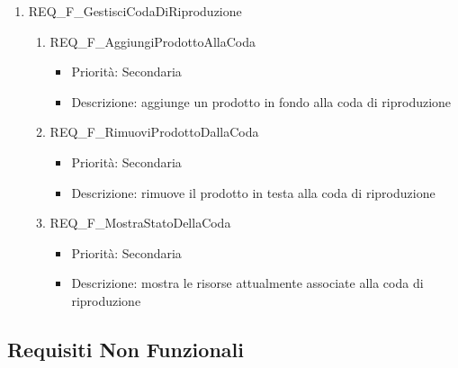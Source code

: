 \begin{enumerate}
	\item REQ\_F\_GestisciCodaDiRiproduzione
		\begin{enumerate}[label*=\arabic*.]
		\item REQ\_F\_AggiungiProdottoAllaCoda
			\begin{itemize}	
			\item Priorità: Secondaria
			\item Descrizione: aggiunge un prodotto in fondo alla coda di riproduzione
			\end{itemize}
		\item REQ\_F\_RimuoviProdottoDallaCoda
			\begin{itemize}	
			\item Priorità: Secondaria
			\item Descrizione: rimuove il prodotto in testa alla coda di riproduzione
			\end{itemize}
		\item REQ\_F\_MostraStatoDellaCoda
			\begin{itemize}	
			\item Priorità: Secondaria
			\item Descrizione: mostra le risorse attualmente associate alla coda di riproduzione
			\end{itemize}
		\end{enumerate}


\end{enumerate}

\subsection{Requisiti Non Funzionali}

